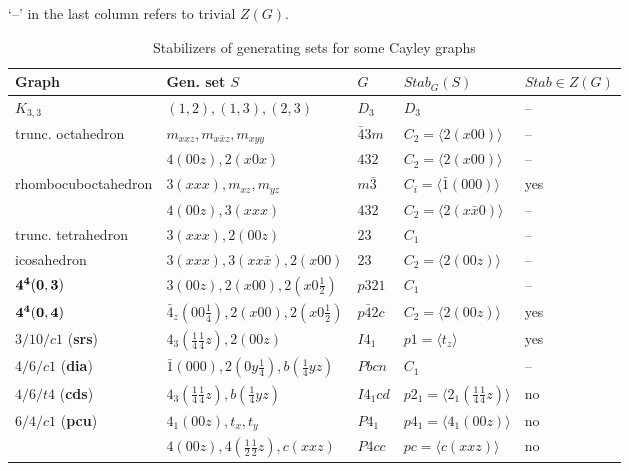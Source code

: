 \documentclass[11pt,a4paper]{article}
\begin{document}
{\tiny
\begin{table}[t]
\caption{Stabilizers of generating sets for some Cayley graphs}
\label{t:table3}
\vspace{0.3em}
\small \raggedright \hspace{3.2em} `--' in the last column refers to trivial $Z(G)$.\\
\vspace{-1em}
\begin{center}
\begin{tabular}{|l|l|l|l|l|}
\hline
Graph & Gen. set $S$ & $G$ & $Stab_G(S)$ & $Stab \in Z(G)$ \\
\hline
$K_{3,3}$  &  $(1, 2), (1, 3), (2, 3)$ & $D_3$ & $D_3$ & -- \\
\hline
\rule{0pt}{2.5ex} trunc. octahedron & $m_{xxz}, m_{x\bar{x}z}, m_{xyy}$ & $\bar43m$ & $C_2 = \langle 2(x00)\rangle$ & -- \\
& $4(00z), 2(x0x)$ & $432$ & $C_2 = \langle 2(x00)\rangle$ & -- \\
\hline
\rule{0pt}{2.5ex} rhombocuboctahedron & $3(xxx), m_{xz}, m_{yz}$ & $m\bar3$ & $C_i = \langle \bar1(000) \rangle$ & yes \\
& $4(00z), 3(xxx)$ & $432$ & $C_2 = \langle 2(x\bar{x}0)\rangle$ & -- \\
\hline
\rule{0pt}{2.5ex} trunc. tetrahedron & $3(xxx), 2(00z)$ & $23$ & $C_1$ & -- \\
\hline
\rule{0pt}{2.5ex} icosahedron & $3(xxx), 3(xx\bar{x}), 2(x00)$ & $23$ & $C_2 = \langle 2(00z)\rangle$ & -- \\
\hline
\rule{0pt}{2.5ex} $\bf 4^4(0, 3)$ & $3(00z), 2(x00), 2(x0\frac{1}{2})$ & $p321$ & $C_1$ & -- \\
\hline
\rule{0pt}{2.5ex} $\bf 4^4(0, 4)$ & $\bar4_z(00\frac{1}{4}), 2(x00), 2(x0\frac{1}{2})$ & $p\bar42c$ & $C_2 = \langle 2(00z)\rangle$ & yes \\
\hline
\rule{0pt}{2.5ex} $3/10/c1$ ({\bf srs}) & $4_3(\frac{1}{4}\frac{1}{4}z), 2(00z)$ & $I4_1$ & $p1 = \langle t_z \rangle$ & yes \\
\hline
\rule{0pt}{2.5ex} $4/6/c1$ ({\bf dia}) & $\bar1(000), 2(0y\frac{1}{4}), b(\frac{1}{4}yz)$  & $Pbcn$ & $C_1$ & -- \\
\hline
\rule{0pt}{2.5ex} $4/6/t4$ ({\bf cds}) & $4_3(\frac{1}{4}\frac{1}{4}z), b(\frac{1}{4}yz)$  & $I4_1cd$ & $p2_1 = \langle 2_1(\frac{1}{4}\frac{1}{4}z) \rangle$ & no \\
\hline
\rule{0pt}{2.5ex} $6/4/c1$ ({\bf pcu}) & $4_1(00z), t_x, t_y$  & $P4_1$ & $p4_1 = \langle 4_1(00z) \rangle$ & no \\
\rule{0pt}{2.5ex} &  $4(00z), 4(\frac{1}{2}\frac{1}{2}z), c(xxz)$ & $P4cc$ & $pc = \langle c(xxz) \rangle$ & no \\
\hline

\end{tabular}
\end{center}
\end{table}
}
\end{document}
